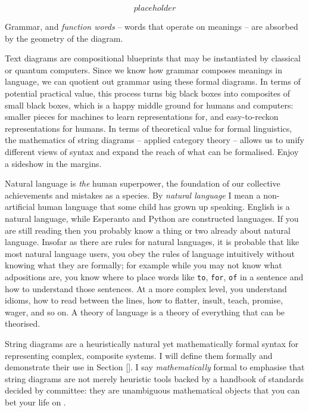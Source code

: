 \begin{marginfigure}
\centering
\[placeholder\]
\caption{Grammar, and \emph{function words} -- words that operate on meanings -- are absorbed by the geometry of the diagram.}
\end{marginfigure}


Text diagrams are compositional blueprints that may be instantiated by classical or quantum computers. Since we know how grammar composes meanings in language, we can quotient out grammar using these formal diagrams. In terms of potential practical value, this process turns big black boxes into composites of small black boxes, which is a happy middle ground for humans and computers: smaller pieces for machines to learn representations for, and easy-to-reckon representations for humans. In terms of theoretical value for formal linguistics, the mathematics of string diagrams -- applied category theory -- allows us to unify different views of syntax and expand the reach of what can be formalised. Enjoy a sideshow in the margins.


Natural language is \emph{the} human superpower, the foundation of our collective achievements and mistakes as a species. By \emph{natural language} I mean a non-artificial human language that some child has grown up speaking. English is a natural language, while Esperanto and Python are constructed languages. If you are still reading then you probably know a thing or two already about natural language. Insofar as there are rules for natural languages, it is probable that like most natural language users, you obey the rules of language intuitively without knowing what they are formally; for example while you may not know what adpositions are, you know where to place words like \texttt{to}, \texttt{for}, \texttt{of} in a sentence and how to understand those sentences. At a more complex level, you understand idioms, how to read between the lines, how to flatter, insult, teach, promise, wager, and so on. A theory of language is a theory of everything that can be theorised.


String diagrams are a heuristically natural yet mathematically formal syntax for representing complex, composite systems. I will define them formally and demonstrate their use in Section \ref{}. I say \emph{mathematically} formal to emphasise that string diagrams are not merely heuristic tools backed by a handbook of standards decided by committee: they are unambiguous mathematical objects that you can bet your life on \citep{joyal_geometry_1991,joyal_geometry_nodate,maclane_natural_1963,lane_categories_2010,selinger_survey_2010}.\\


